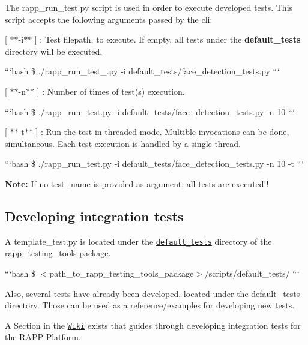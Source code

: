 The rapp\-\_\-run\-\_\-test.\-py script is used in order to execute developed tests. This script accepts the following arguments passed by the cli\-:


\begin{DoxyItemize}
\item \mbox{[} $\ast$$\ast$-\/i$\ast$$\ast$ \mbox{]} \-: Test filepath, to execute. If empty, all tests under the {\bfseries default\-\_\-tests} directory will be executed.
\end{DoxyItemize}

```bash \$ ./rapp\-\_\-run\-\_\-test\-\_\-.py -\/i default\-\_\-tests/face\-\_\-detection\-\_\-tests.\-py ```


\begin{DoxyItemize}
\item \mbox{[} $\ast$$\ast$-\/n$\ast$$\ast$ \mbox{]} \-: Number of times of test(s) execution.
\end{DoxyItemize}

```bash \$ ./rapp\-\_\-run\-\_\-test.py -\/i default\-\_\-tests/face\-\_\-detection\-\_\-tests.\-py -\/n 10 ```


\begin{DoxyItemize}
\item \mbox{[} $\ast$$\ast$-\/t$\ast$$\ast$ \mbox{]} \-: Run the test in threaded mode. Multible invocations can be done, simultaneous. Each test execution is handled by a single thread.
\end{DoxyItemize}

```bash \$ ./rapp\-\_\-run\-\_\-test.py -\/i default\-\_\-tests/face\-\_\-detection\-\_\-tests.\-py -\/n 10 -\/t ```

{\bfseries Note\-:} If no test\-\_\-name is provided as argument, all tests are executed!!

\subsection*{Developing integration tests}

A template\-\_\-test.\-py is located under the \href{https://github.com/rapp-project/rapp-platform/tree/master/rapp_testing_tools/scripts/default_tests}{\tt default\-\_\-tests} directory of the rapp\-\_\-testing\-\_\-tools package.

```bash \$ $<$path\-\_\-to\-\_\-rapp\-\_\-testing\-\_\-tools\-\_\-package$>$/scripts/default\-\_\-tests/ ```

Also, several tests have already been developed, located under the default\-\_\-tests directory. Those can be used as a reference/examples for developing new tests.

A Section in the \href{https://github.com/rapp-project/rapp-platform/wiki/How-to-implement-an-integration-test%3F}{\tt Wiki} exists that guides through developing integration tests for the R\-A\-P\-P Platform. 